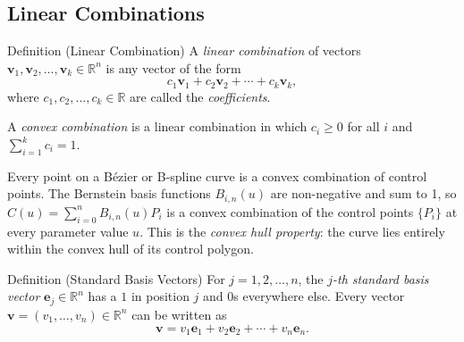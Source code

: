 \subsection*{Linear Combinations}

\begin{propositionbox}{Definition (Linear Combination)}
A \emph{linear combination} of vectors $\mathbf{v}_1, \mathbf{v}_2, \ldots, \mathbf{v}_k \in \mathbb{R}^n$
is any vector of the form
\[
  c_1\mathbf{v}_1 + c_2\mathbf{v}_2 + \cdots + c_k\mathbf{v}_k,
\]
where $c_1, c_2, \ldots, c_k \in \mathbb{R}$ are called the \emph{coefficients}.

A \emph{convex combination} is a linear combination in which $c_i \geq 0$
for all $i$ and $\sum_{i=1}^k c_i = 1$.
\end{propositionbox}

\begin{remark*}
Every point on a B\'{e}zier or B-spline curve is a convex combination of control points.
The Bernstein basis functions $B_{i,n}(u)$ are non-negative and sum to 1,
so $C(u) = \sum_{i=0}^n B_{i,n}(u) P_i$ is a convex combination of the control
points $\{P_i\}$ at every parameter value $u$.
This is the \emph{convex hull property}: the curve lies entirely within the convex hull
of its control polygon.
\end{remark*}

\begin{propositionbox}{Definition (Standard Basis Vectors)}
For $j = 1, 2, \ldots, n$, the \emph{$j$-th standard basis vector} $\mathbf{e}_j \in \mathbb{R}^n$
has a $1$ in position $j$ and $0$s everywhere else.
Every vector $\mathbf{v} = (v_1, \ldots, v_n) \in \mathbb{R}^n$ can be written as
\[
  \mathbf{v} = v_1 \mathbf{e}_1 + v_2 \mathbf{e}_2 + \cdots + v_n \mathbf{e}_n.
\]
\end{propositionbox}
